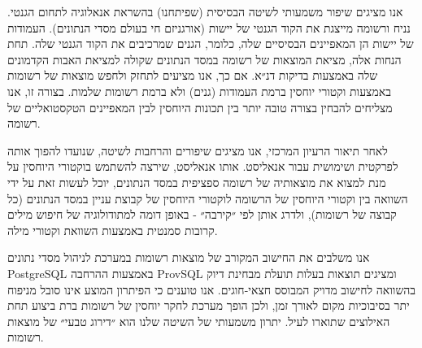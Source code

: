 {אנו מציגים שיפור משמעותי לשיטה הבסיסית (שפיתחנו) בהשראת אנאלוגיה לתחום הגנטי.
נניח ורשומה מייצגת את הקוד הגנטי של יישות (אורגניזם חי בעולם מסדי הנתונים).
העמודות של יישות הן המאפיינים הבסיסיים שלה, כלומר, הגנים שמרכיבים את הקוד הגנטי שלה.
תחת הנחות אלה, מציאת המוצאות של רשומה במסד הנתונים שקולה למציאת האבות הקדמונים שלה באמצעות בדיקות דנ״א.
אם כך, אנו מציעים לתחזק ולחפש מוצאות של רשומות באמצעות וקטורי יוחסין ברמת העמודות (גנים) ולא ברמת רשומות שלמות. בצורה זו, אנו מצליחים להבחין בצורה טובה יותר בין תכונות היוחסין לבין המאפיינים הטקסטואליים של רשומה.

לאחר תיאור הרעיון המרכזי, אנו מציגים שיפורים והרחבות לשיטה, שנועדו להפוך אותה לפרקטית ושימושית עבור אנאליסט. אותו אנאליסט, שירצה להשתמש בוקטורי היוחסין על מנת למצוא את מוצאותיה של רשומה ספציפית במסד הנתונים, יוכל לעשות זאת על ידי השוואה בין וקטורי היוחסין של הרשומה לוקטורי היוחסין של קבוצת עניין במסד הנתונים (כל קבוצה של רשומות), ולדרג אותן לפי ״קירבה״ - באופן דומה למתודולוגיה של חיפוש מילים קרובות סמנטית באמצעות השוואת וקטורי מילה.

אנו משלבים את החישוב המקורב של מוצאות רשומות במערכת לניהול מסדי נתונים
\textenglish{PostgreSQL}
באמצעות ההרחבה
\textenglish{ProvSQL}
ומציגים תוצאות בעלות תועלת מבחינת דיוק בהשוואה לחישוב מדויק המבוסס חצאי-חוגים.
אנו טוענים כי הפיתרון המוצע אינו סובל מניפוח יתר בסיבוכיות מקום לאורך זמן,
ולכן הופך מערכת לחקר יוחסין של רשומות ברת ביצוע תחת האילוצים שתוארו לעיל.
יתרון משמעותי של השיטה שלנו הוא ״דירוג טבעי״ של מוצאות רשומות.









}

